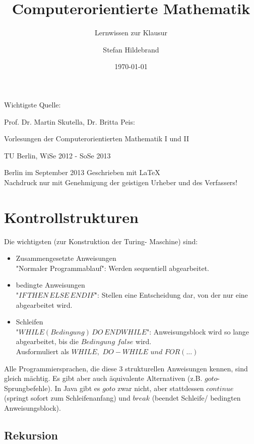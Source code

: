 \documentclass[fleqn]{scrartcl}
\title{Computerorientierte Mathematik}
\subtitle{Lernwissen zur Klausur}
\author{Stefan Hildebrand}
\date{\today}
\begin{document}
\maketitle
\thispagestyle{empty}
\begin{center}
Wichtigste Quelle: 

Prof. Dr. Martin Skutella, Dr. Britta Peis: 

Vorlesungen der Computerorientierten Mathematik I und II

TU Berlin, WiSe 2012 - SoSe 2013
\end{center}
\vfill Berlin im September 2013 \hfill Geschrieben mit \LaTeX\\
Nachdruck nur mit Genehmigung der geistigen Urheber und des Verfassers!
%
%
%
\newpage
\tableofcontents
\newpage

\section{Kontrollstrukturen}
Die wichtigsten (zur Konstruktion der Turing- Maschine) sind:
\begin{itemize}
\item Zusammengesetzte Anweisungen\\
"Normaler Programmablauf": Werden sequentiell abgearbeitet.
\item bedingte Anweisungen\\
"$IF\, THEN\, ELSE\, ENDIF$": Stellen eine Entscheidung dar, von der nur eine abgearbeitet wird.
\item Schleifen\\
"$WHILE (Bedingung)\, DO\, ENDWHILE$": Anweisungsblock wird so lange abgearbeitet, bis die $Bedingung$ $false$ wird.\\
Ausformuliert als $WHILE, \,\, DO- WHILE\,\, und \,\, FOR(...)$ 
\end{itemize}
Alle Programmiersprachen, die diese 3 strukturellen Anweisungen kennen, sind gleich mächtig.
Es gibt aber auch äquivalente Alternativen (z.B. $goto$- Sprungbefehle).
In Java gibt es $goto$ zwar nicht, aber stattdessen $continue$ (springt sofort zum Schleifenanfang) und $break$ (beendet Schleife/ bedingten Anweisungsblock).

\subsection{Rekursion}
\end{document}
